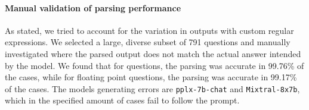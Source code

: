 \paragraph*{Manual validation of parsing performance}

As stated, we tried to account for the variation in outputs with custom regular expressions.
We selected a large, diverse subset of 791 questions and manually investigated where the parsed output does not match the actual answer intended by the model.
We found that for  questions, the parsing was accurate in 99.76\% of the cases, while for floating point questions, the parsing was accurate in 99.17\% of the cases.
The models generating errors are \texttt{pplx-7b-chat} and \texttt{Mixtral-8x7b}, which in the specified amount of cases fail to follow the prompt.
